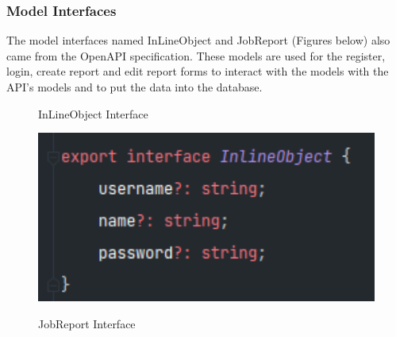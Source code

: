 \subsubsection{Model Interfaces}
The model interfaces named InLineObject and JobReport (Figures below) also came from the OpenAPI specification. These models are used for the register, login, create report and edit report forms to interact with the models with the API's models and to put the data into the database. 

\begin{figure}[H]
\centering
\begin{minipage}[b]{0.45\linewidth}
    \centering
    \caption{InLineObject Interface}
    \label{image:iloInterface}
    \includegraphics[width=1.0\textwidth]{images/repota/models/inlineobject_model.png}
\end{minipage}
\quad
\begin{minipage}[b]{0.45\linewidth}
    \centering
    \caption{JobReport Interface}
    \label{image:jrInterface}

\end{minipage}
\end{figure}
